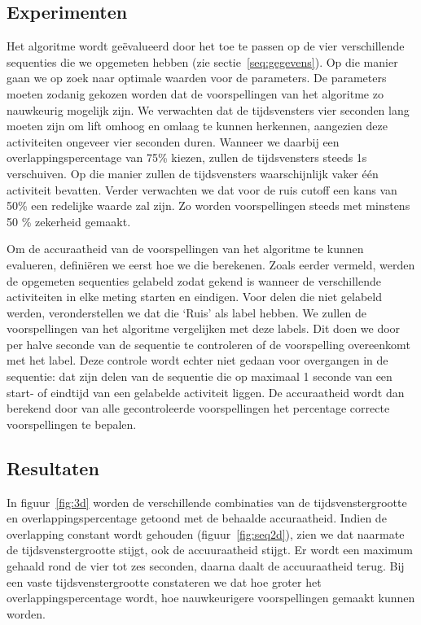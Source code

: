 \documentclass{article}
\begin{document}
\subsection{Experimenten}
\label{experimenten}

Het algoritme wordt ge\"evalueerd door het toe te passen op de vier verschillende sequenties die we opgemeten hebben (zie sectie~\ref{seq:gegevens}). Op die manier gaan we op zoek naar optimale waarden voor de parameters. De parameters moeten zodanig gekozen worden dat de voorspellingen van het algoritme zo nauwkeurig mogelijk zijn. We verwachten dat de tijdsvensters vier seconden lang moeten zijn om lift omhoog en omlaag te kunnen herkennen, aangezien deze activiteiten ongeveer vier seconden duren. Wanneer we daarbij een overlappingspercentage van 75\% kiezen, zullen de tijdsvensters steeds 1s verschuiven. Op die manier zullen de tijdsvensters waarschijnlijk vaker \'e\'en activiteit bevatten. Verder verwachten we dat voor de ruis cutoff een kans van 50\% een redelijke waarde zal zijn. Zo worden voorspellingen steeds met minstens 50 \% zekerheid gemaakt. 

Om de accuraatheid van de voorspellingen van het algoritme te kunnen evalueren, defini\"eren we eerst hoe we die berekenen. Zoals eerder vermeld, werden de opgemeten sequenties gelabeld zodat gekend is wanneer de verschillende activiteiten in elke meting starten en eindigen. Voor delen die niet gelabeld werden, veronderstellen we dat die `Ruis' als label hebben. We zullen de voorspellingen van het algoritme vergelijken met deze labels. Dit doen we door per halve seconde van de sequentie te controleren of de voorspelling overeenkomt met het label. Deze controle wordt echter niet gedaan voor overgangen in de sequentie: dat zijn delen van de sequentie die op maximaal 1 seconde van een start- of eindtijd van een gelabelde activiteit liggen. De accuraatheid wordt dan berekend door van alle gecontroleerde voorspellingen het percentage correcte voorspellingen te bepalen.

\subsection{Resultaten}

In figuur~\ref{fig:3d} worden de verschillende combinaties van de tijdsvenstergrootte en overlappingspercentage getoond met de behaalde accuraatheid. Indien de overlapping constant wordt gehouden (figuur~\ref{fig:seq2d}), zien we dat naarmate de tijdsvenstergrootte stijgt, ook de accuuraatheid stijgt. Er wordt een maximum gehaald rond de vier tot zes seconden, daarna daalt de accuuraatheid terug. Bij een vaste tijdsvenstergrootte constateren we dat hoe groter het overlappingspercentage wordt, hoe nauwkeurigere voorspellingen gemaakt kunnen worden.
\end{document}
